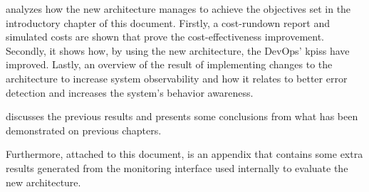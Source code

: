  analyzes how the new architecture manages to achieve the objectives set in the introductory chapter of this document. Firstly, a cost-rundown report and simulated costs are shown that prove the cost-effectiveness improvement. Secondly, it shows how, by using the new architecture, the DevOps' \glspl{kpi}s have improved. Lastly, an overview of the result of implementing changes to the architecture to increase system observability and how it relates to better error detection and increases the system's behavior awareness.

 discusses the previous results and presents some conclusions from what has been demonstrated on previous chapters.

Furthermore, attached to this document, is an appendix that contains some extra results generated from the monitoring interface used internally to evaluate the new architecture.












